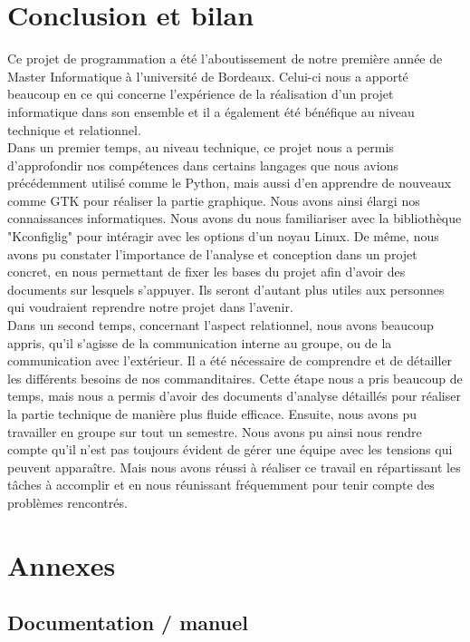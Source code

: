 \documentclass[16pts]{report}
\begin{document}
\chapter{Conclusion et bilan}
\label{cha:Conclusion et bilan}

Ce projet de programmation a été l'aboutissement de notre première année 
de Master Informatique à l'université de Bordeaux. Celui-ci nous a apporté 
beaucoup en ce qui concerne l'expérience de la réalisation d'un projet 
informatique dans son ensemble et il a également été bénéfique au niveau 
technique et relationnel.\\

Dans un premier temps, au niveau technique, ce projet nous a permis 
d'approfondir nos compétences dans certains langages que nous avions 
précédemment utilisé comme le Python, mais aussi d'en apprendre de 
nouveaux comme GTK pour réaliser la partie graphique. Nous avons ainsi 
élargi nos connaissances informatiques. Nous avons du nous familiariser 
avec la bibliothèque "Kconfiglig" pour intéragir avec les options d'un 
noyau Linux. De même, nous avons pu constater l'importance de l'analyse 
et conception dans un projet concret, en nous permettant de fixer les bases 
du projet afin d'avoir des documents sur lesquels s'appuyer. Ils seront 
d'autant plus utiles aux personnes qui voudraient reprendre notre projet 
dans l'avenir.\\

Dans un second temps, concernant l'aspect relationnel, nous avons beaucoup 
appris, qu'il s'agisse de la communication interne au groupe, ou de la 
communication avec l'extérieur. Il a été nécessaire de comprendre et de 
détailler les différents besoins de nos commanditaires. Cette étape nous 
a pris beaucoup de temps, mais nous a permis d'avoir des documents d'analyse 
détaillés pour réaliser la partie technique de manière plus fluide efficace. 
Ensuite, nous avons pu travailler en groupe sur tout un semestre. Nous 
avons pu ainsi nous rendre compte qu'il n'est pas toujours évident de gérer 
une équipe avec les tensions qui peuvent apparaître. Mais nous avons réussi à 
réaliser ce travail en répartissant les tâches à accomplir et en nous 
réunissant fréquemment pour tenir compte des problèmes rencontrés.\\


\chapter{Annexes}
\label{cha:Annexes}
    \section{Documentation / manuel}
    \label{sec:Documentation / manuel}


\end{document}

